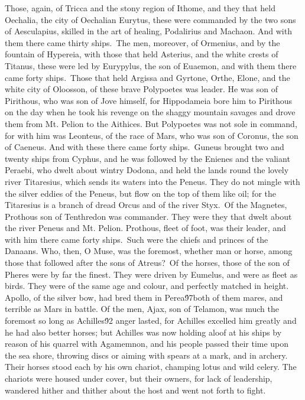 {Those, again, of Tricca and the stony region of Ithome, and they that held Oechalia, the city of Oechalian Eurytus, these were commanded by the two sons of Aesculapius, skilled in the art of healing, Podalirius and Machaon. And with them there came thirty ships.\
The men, moreover, of Ormenius, and by the fountain of Hypereia, with those that held Asterius, and the white crests of Titanus, these were led by Eurypylus, the son of Euaemon, and with them there came forty ships.\
Those that held Argissa and Gyrtone, Orthe, Elone, and the white city of Oloosson, of these brave Polypoetes was leader. He was son of Pirithous, who was son of Jove himself, for Hippodameia bore him to Pirithous on the day when he took his revenge on the shaggy mountain savages and drove them from Mt. Pelion to the Aithices. But Polypoetes was not sole in command, for with him was Leonteus, of the race of Mars, who was son of Coronus, the son of Caeneus. And with these there came forty ships.\
Guneus brought two and twenty ships from Cyphus, and he was followed by the Enienes and the valiant Peraebi, who dwelt about wintry Dodona, and held the lands round the lovely river Titaresius, which sends its waters into the Peneus. They do not mingle with the silver eddies of the Peneus, but flow on the top of them like oil; for the Titaresius is a branch of dread Orcus and of the river Styx.\
Of the Magnetes, Prothous son of Tenthredon was commander. They were they that dwelt about the river Peneus and Mt. Pelion. Prothous, fleet of foot, was their leader, and with him there came forty ships.\
Such were the chiefs and princes of the Danaans. Who, then, O Muse, was the foremost, whether man or horse, among those that followed after the sons of Atreus?\
Of the horses, those of the son of Pheres were by far the finest. They were driven by Eumelus, and were as fleet as birds. They were of the same age and colour, and perfectly matched in height. Apollo, of the silver bow, had bred them in Perea\'97both of them mares, and terrible as Mars in battle. Of the men, Ajax, son of Telamon, was much the foremost so long as Achilles\'92 anger lasted, for Achilles excelled him greatly and he had also better horses; but Achilles was now holding aloof at his ships by reason of his quarrel with Agamemnon, and his people passed their time upon the sea shore, throwing discs or aiming with spears at a mark, and in archery. Their horses stood each by his own chariot, champing lotus and wild celery. The chariots were housed under cover, but their owners, for lack of leadership, wandered hither and thither about the host and went not forth to fight.\
}
